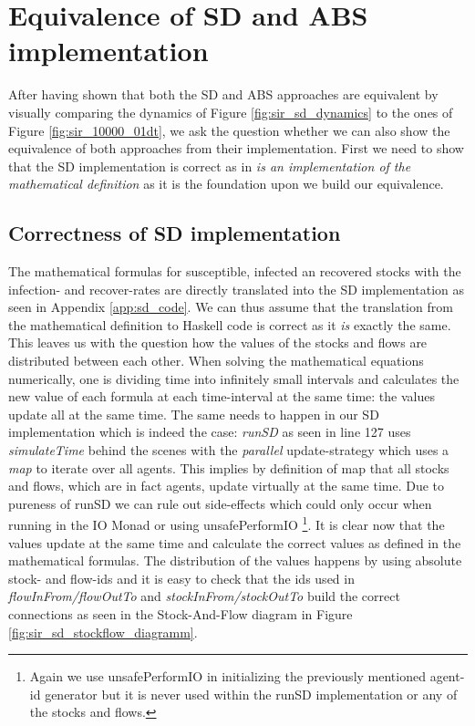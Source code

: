\section{Equivalence of SD and ABS implementation}
After having shown that both the SD and ABS approaches are equivalent by visually comparing the dynamics of Figure \ref{fig:sir_sd_dynamics} to the ones of Figure \ref{fig:sir_10000_01dt}, we ask the question whether we can also show the equivalence of both approaches from their implementation.
First we need to show that the SD implementation is correct as in \textit{is an implementation of the mathematical definition} as it is the foundation upon we build our equivalence.

\subsection{Correctness of SD implementation}
The mathematical formulas for susceptible, infected an recovered stocks with the infection- and recover-rates are directly translated into the SD implementation as seen in Appendix \ref{app:sd_code}. We can thus assume that the translation from the mathematical definition to Haskell code is correct as it \textit{is} exactly the same. This leaves us with the question how the values of the stocks and flows are distributed between each other. When solving the mathematical equations numerically, one is dividing time into infinitely small intervals and calculates the new value of each formula at each time-interval at the same time: the values update all at the same time.
The same needs to happen in our SD implementation which is indeed the case: \textit{runSD} as seen in line 127 uses \textit{simulateTime} behind the scenes with the \textit{parallel} update-strategy which uses a \textit{map} to iterate over all agents. This implies by definition of map that all stocks and flows, which are in fact agents, update virtually at the same time. Due to pureness of runSD we can rule out side-effects which could only occur when running in the IO Monad or using unsafePerformIO \footnote{Again we use unsafePerformIO in initializing the previously mentioned agent-id generator but it is never used within the runSD implementation or any of the stocks and flows.}. 
It is clear now that the values update at the same time and calculate the correct values as defined in the mathematical formulas. The distribution of the values happens by using absolute stock- and flow-ids and it is easy to check that the ids used in \textit{flowInFrom/flowOutTo} and \textit{stockInFrom/stockOutTo} build the correct connections as seen in the Stock-And-Flow diagram in Figure \ref{fig:sir_sd_stockflow_diagramm}.
